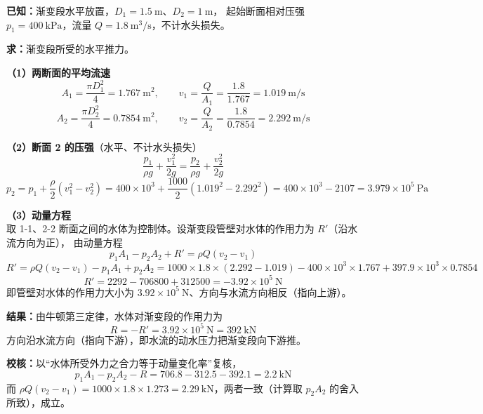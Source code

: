 \begin{jie}
\textbf{已知：}渐变段水平放置，$D_1=1.5\ \mathrm{m}$、$D_2=1\ \mathrm{m}$，
起始断面相对压强 $p_1=400\ \mathrm{kPa}$，流量 $Q=1.8\ \mathrm{m^3/s}$，不计水头损失。

\textbf{求：}渐变段所受的水平推力。

\textbf{（1）两断面的平均流速}
\[
A_1=\frac{\pi D_1^{2}}{4}=1.767\ \mathrm{m^2},\qquad v_1=\frac{Q}{A_1}=\frac{1.8}{1.767}=1.019\ \mathrm{m/s}
\]
\[
A_2=\frac{\pi D_2^{2}}{4}=0.7854\ \mathrm{m^2},\qquad v_2=\frac{Q}{A_2}=\frac{1.8}{0.7854}=2.292\ \mathrm{m/s}
\]

\textbf{（2）断面 2 的压强}（水平、不计水头损失）
\[
\frac{p_1}{\rho g}+\frac{v_1^{2}}{2g}=\frac{p_2}{\rho g}+\frac{v_2^{2}}{2g}
\]
\[
p_2=p_1+\frac{\rho}{2}\left(v_1^{2}-v_2^{2}\right)
=400\times10^{3}+\frac{1000}{2}\left(1.019^{2}-2.292^{2}\right)=400\times10^{3}-2107=3.979\times10^{5}\ \mathrm{Pa}
\]

\textbf{（3）动量方程}\\
取 1-1、2-2 断面之间的水体为控制体。设渐变段管壁对水体的作用力为 $R'$（沿水流方向为正），
由动量方程
\[
p_1A_1-p_2A_2+R'=\rho Q\left(v_2-v_1\right)
\]
\[
R'=\rho Q(v_2-v_1)-p_1A_1+p_2A_2
=1000\times1.8\times(2.292-1.019)-400\times10^{3}\times1.767+397.9\times10^{3}\times0.7854
\]
\[
R'=2292-706800+312500=-3.92\times10^{5}\ \mathrm{N}
\]
即管壁对水体的作用力大小为 $3.92\times10^{5}\ \mathrm{N}$、方向与水流方向相反（指向上游）。

\textbf{结果：}由牛顿第三定律，水体对渐变段的作用力为
\[
R=-R'=3.92\times10^{5}\ \mathrm{N}=392\ \mathrm{kN}
\]
方向沿水流方向（指向下游），即水流的动水压力把渐变段向下游推。

\textbf{校核：}以“水体所受外力之合力等于动量变化率”复核，
\[
p_1A_1-p_2A_2-R=706.8-312.5-392.1=2.2\ \mathrm{kN}
\]
而 $\rho Q(v_2-v_1)=1000\times1.8\times1.273=2.29\ \mathrm{kN}$，两者一致（计算取 $p_2A_2$ 的舍入所致），成立。
\end{jie}


